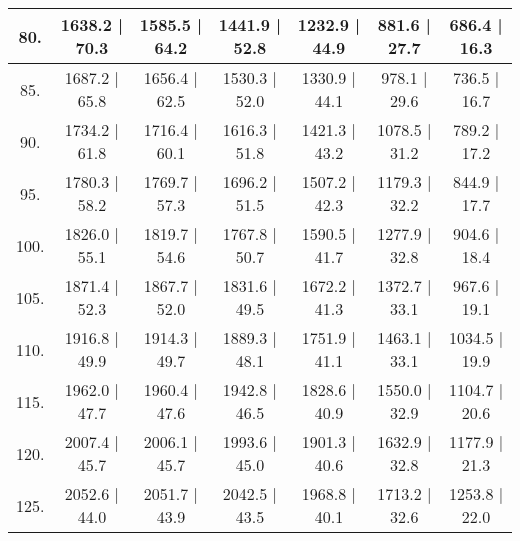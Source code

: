 \begin{tabular}{|c||c|c|c|c|c|c|}
\hline
  80. &   1638.2 |    70.3 &   1585.5 |    64.2 &   1441.9 |    52.8 &   1232.9 |    44.9 &    881.6 |    27.7 &    686.4 |    16.3\tabularnewline
\hline
  85. &   1687.2 |    65.8 &   1656.4 |    62.5 &   1530.3 |    52.0 &   1330.9 |    44.1 &    978.1 |    29.6 &    736.5 |    16.7\tabularnewline
\hline
  90. &   1734.2 |    61.8 &   1716.4 |    60.1 &   1616.3 |    51.8 &   1421.3 |    43.2 &   1078.5 |    31.2 &    789.2 |    17.2\tabularnewline
\hline
  95. &   1780.3 |    58.2 &   1769.7 |    57.3 &   1696.2 |    51.5 &   1507.2 |    42.3 &   1179.3 |    32.2 &    844.9 |    17.7\tabularnewline
\hline
 100. &   1826.0 |    55.1 &   1819.7 |    54.6 &   1767.8 |    50.7 &   1590.5 |    41.7 &   1277.9 |    32.8 &    904.6 |    18.4\tabularnewline
\hline
 105. &   1871.4 |    52.3 &   1867.7 |    52.0 &   1831.6 |    49.5 &   1672.2 |    41.3 &   1372.7 |    33.1 &    967.6 |    19.1\tabularnewline
\hline
 110. &   1916.8 |    49.9 &   1914.3 |    49.7 &   1889.3 |    48.1 &   1751.9 |    41.1 &   1463.1 |    33.1 &   1034.5 |    19.9\tabularnewline
\hline
 115. &   1962.0 |    47.7 &   1960.4 |    47.6 &   1942.8 |    46.5 &   1828.6 |    40.9 &   1550.0 |    32.9 &   1104.7 |    20.6\tabularnewline
\hline
 120. &   2007.4 |    45.7 &   2006.1 |    45.7 &   1993.6 |    45.0 &   1901.3 |    40.6 &   1632.9 |    32.8 &   1177.9 |    21.3\tabularnewline
\hline
 125. &   2052.6 |    44.0 &   2051.7 |    43.9 &   2042.5 |    43.5 &   1968.8 |    40.1 &   1713.2 |    32.6 &   1253.8 |    22.0\tabularnewline
\hline
\end{tabular}
